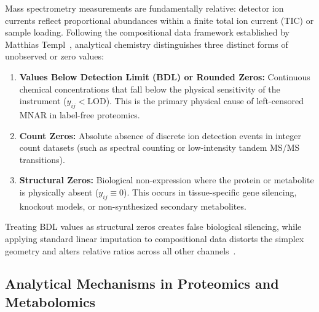 \documentclass[11pt,oneside]{book}
\begin{document}
Mass spectrometry measurements are fundamentally relative: detector ion currents reflect proportional abundances within a finite total ion current (TIC) or sample loading. Following the compositional data framework established by Matthias Templ~\cite{templ2023visualization}, analytical chemistry distinguishes three distinct forms of unobserved or zero values:
\begin{enumerate}
    \item \textbf{Values Below Detection Limit (BDL) or Rounded Zeros:} Continuous chemical concentrations that fall below the physical sensitivity of the instrument ($y_{ij} < \text{LOD}$). This is the primary physical cause of left-censored MNAR in label-free proteomics.
    \item \textbf{Count Zeros:} Absolute absence of discrete ion detection events in integer count datasets (such as spectral counting or low-intensity tandem MS/MS transitions).
    \item \textbf{Structural Zeros:} Biological non-expression where the protein or metabolite is physically absent ($y_{ij} \equiv 0$). This occurs in tissue-specific gene silencing, knockout models, or non-synthesized secondary metabolites.
\end{enumerate}
Treating BDL values as structural zeros creates false biological silencing, while applying standard linear imputation to compositional data distorts the simplex geometry and alters relative ratios across all other channels~\cite{templ2023visualization}.

\subsection{Analytical Mechanisms in Proteomics and Metabolomics}
\end{document}

